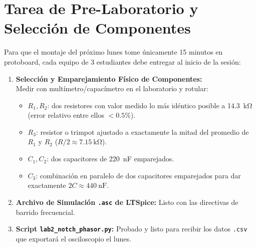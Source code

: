 \documentclass[11pt,a4paper,twoside]{article}
\begin{document}
\section{Tarea de Pre-Laboratorio y Selección de Componentes}
Para que el montaje del próximo lunes tome únicamente 15 minutos en protoboard, cada equipo de 3 estudiantes debe entregar al inicio de la sesión:

\begin{enumerate}
    \item \textbf{Selección y Emparejamiento Físico de Componentes:}\\
    Medir con multímetro/capacímetro en el laboratorio y rotular:
    \begin{itemize}
        \item $R_1, R_2$: dos resistores con valor medido lo más idéntico posible a \qty{14.3}{\kilo\ohm} (error relativo entre ellos $< 0.5\%$).
        \item $R_3$: resistor o trimpot ajustado a exactamente la mitad del promedio de $R_1$ y $R_2$ ($R/2 \approx \qty{7.15}{\kilo\ohm}$).
        \item $C_1, C_2$: dos capacitores de \qty{220}{\nano\farad} emparejados.
        \item $C_3$: combinación en paralelo de dos capacitores emparejados para dar exactamente $2C \approx \qty{440}{\nano\farad}$.
    \end{itemize}
    \item \textbf{Archivo de Simulación \texttt{.asc} de LTSpice:} Listo con las directivas de barrido frecuencial.
    \item \textbf{Script \texttt{lab2\_notch\_phasor.py}:} Probado y listo para recibir los datos \texttt{.csv} que exportará el osciloscopio el lunes.
\end{enumerate}
\end{document}
